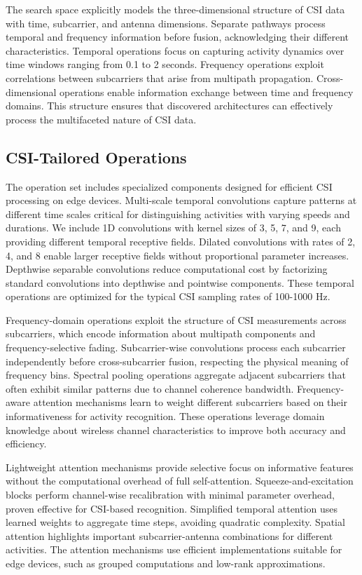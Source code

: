 \documentclass[journal]{IEEEtran}
\begin{document}
The search space explicitly models the three-dimensional structure of CSI data with time, subcarrier, and antenna dimensions. Separate pathways process temporal and frequency information before fusion, acknowledging their different characteristics. Temporal operations focus on capturing activity dynamics over time windows ranging from 0.1 to 2 seconds. Frequency operations exploit correlations between subcarriers that arise from multipath propagation. Cross-dimensional operations enable information exchange between time and frequency domains. This structure ensures that discovered architectures can effectively process the multifaceted nature of CSI data.

\subsection{CSI-Tailored Operations}

The operation set includes specialized components designed for efficient CSI processing on edge devices. Multi-scale temporal convolutions capture patterns at different time scales critical for distinguishing activities with varying speeds and durations. We include 1D convolutions with kernel sizes of 3, 5, 7, and 9, each providing different temporal receptive fields. Dilated convolutions with rates of 2, 4, and 8 enable larger receptive fields without proportional parameter increases. Depthwise separable convolutions reduce computational cost by factorizing standard convolutions into depthwise and pointwise components. These temporal operations are optimized for the typical CSI sampling rates of 100-1000 Hz.

Frequency-domain operations exploit the structure of CSI measurements across subcarriers, which encode information about multipath components and frequency-selective fading. Subcarrier-wise convolutions process each subcarrier independently before cross-subcarrier fusion, respecting the physical meaning of frequency bins. Spectral pooling operations aggregate adjacent subcarriers that often exhibit similar patterns due to channel coherence bandwidth. Frequency-aware attention mechanisms learn to weight different subcarriers based on their informativeness for activity recognition. These operations leverage domain knowledge about wireless channel characteristics to improve both accuracy and efficiency.

Lightweight attention mechanisms provide selective focus on informative features without the computational overhead of full self-attention. Squeeze-and-excitation blocks perform channel-wise recalibration with minimal parameter overhead, proven effective for CSI-based recognition. Simplified temporal attention uses learned weights to aggregate time steps, avoiding quadratic complexity. Spatial attention highlights important subcarrier-antenna combinations for different activities. The attention mechanisms use efficient implementations suitable for edge devices, such as grouped computations and low-rank approximations.
\end{document}
